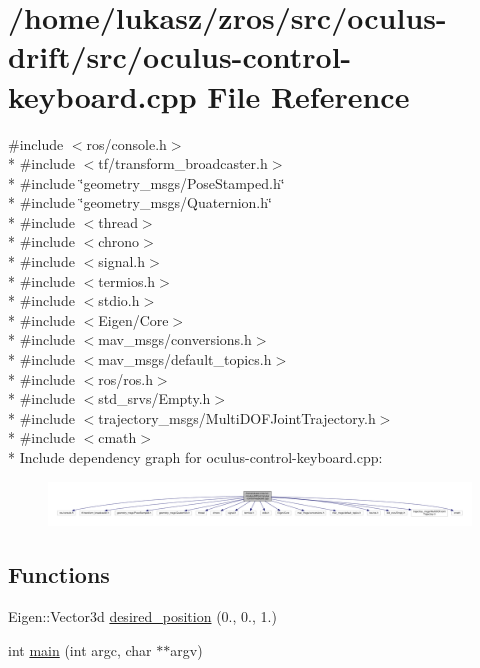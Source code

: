 \hypertarget{oculus-control-keyboard_8cpp}{}\section{/home/lukasz/zros/src/oculus-\/drift/src/oculus-\/control-\/keyboard.cpp File Reference}
\label{oculus-control-keyboard_8cpp}
{\ttfamily \#include $<$ros/console.\+h$>$}\\*
{\ttfamily \#include $<$tf/transform\+\_\+broadcaster.\+h$>$}\\*
{\ttfamily \#include \char`\"{}geometry\+\_\+msgs/\+Pose\+Stamped.\+h\char`\"{}}\\*
{\ttfamily \#include \char`\"{}geometry\+\_\+msgs/\+Quaternion.\+h\char`\"{}}\\*
{\ttfamily \#include $<$thread$>$}\\*
{\ttfamily \#include $<$chrono$>$}\\*
{\ttfamily \#include $<$signal.\+h$>$}\\*
{\ttfamily \#include $<$termios.\+h$>$}\\*
{\ttfamily \#include $<$stdio.\+h$>$}\\*
{\ttfamily \#include $<$Eigen/\+Core$>$}\\*
{\ttfamily \#include $<$mav\+\_\+msgs/conversions.\+h$>$}\\*
{\ttfamily \#include $<$mav\+\_\+msgs/default\+\_\+topics.\+h$>$}\\*
{\ttfamily \#include $<$ros/ros.\+h$>$}\\*
{\ttfamily \#include $<$std\+\_\+srvs/\+Empty.\+h$>$}\\*
{\ttfamily \#include $<$trajectory\+\_\+msgs/\+Multi\+D\+O\+F\+Joint\+Trajectory.\+h$>$}\\*
{\ttfamily \#include $<$cmath$>$}\\*
Include dependency graph for oculus-\/control-\/keyboard.cpp\+:\nopagebreak
\begin{figure}[H]
\begin{center}
\leavevmode
\includegraphics[width=350pt]{oculus-control-keyboard_8cpp__incl}
\end{center}
\end{figure}
\subsection*{Functions}
\begin{DoxyCompactItemize}
\item 
Eigen\+::\+Vector3d \hyperlink{oculus-control-keyboard_8cpp_a608d9948c063034b7605598daaeccc3e}{desired\+\_\+position} (0., 0., 1.)
\item 
int \hyperlink{oculus-control-keyboard_8cpp_a3c04138a5bfe5d72780bb7e82a18e627}{main} (int argc, char $\ast$$\ast$argv)
\end{DoxyCompactItemize}
